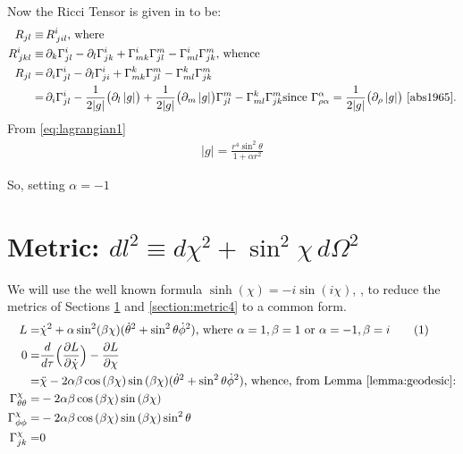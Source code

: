\documentclass[]{article}
\newcommand\numberthis{\addtocounter{equation}{1}\tag{\theequation}}
\begin{document}
Now the Ricci Tensor is given in \cite[II, (58) and (56)]{Akhmedov2017} to be:
\begin{align*}
R_{jl}\equiv&\, R^i_{\,jil}\text{, where}\\
R^i_{\,jkl}\equiv&\,\partial_k\Gamma^i_{jl}-\partial_l\Gamma^i_{jk}+\Gamma^i_{mk} \Gamma^m_{jl} - \Gamma^i_{ml} \Gamma^m_{jk}\text{, whence}\\
R_{jl}=&\,\partial_i\Gamma^i_{jl}-\partial_l\Gamma^i_{ji}+\Gamma^k_{mk} \Gamma^m_{jl} - \Gamma^k_{ml} \Gamma^m_{jk}\\
=&\,\partial_i\Gamma^i_{jl}-\frac{1}{2|g|}\big(\partial_l \, |g|\big)+\frac{1}{2|g|}\big(\partial_m \, |g|\big) \Gamma^m_{jl} - \Gamma^k_{ml} \Gamma^m_{jk}\text{since $\Gamma^{\alpha}_{\rho\alpha}=\frac{1}{2|g|}\big(\partial_\rho \, |g|\big)$ \cite{abs1965}.}
\end{align*}
From \eqref{eq:lagrangian1}
\begin{align*}
|g|=\frac{r^4\sin^2 \theta}{1+\alpha r^2}
\end{align*}




So, setting $\alpha=-1$
\section{Metric: $dl^2\equiv d\chi^2+\sin^2 \chi\,d\Omega^2$} \label{section:metric2}
We will use the well known formula $\sinh(\chi)=-i \sin(i\chi)$, \cite{wiki:sinh}, to reduce the metrics of Sections \ref{section:metric2} and \ref{section:metric4} to a common form.
\begin{align*}
L=&\dot{\chi}^2 + \alpha \sin^2(\beta \chi)(\dot\theta^2 + \sin^2 \theta \dot \phi^2)\text{, where $\alpha=1,\beta=1$ or $\alpha=-1,\beta=i$} \numberthis \label{eq:lagrangian2}\\
0=&\frac{d}{d \tau}\Big(\frac{\partial L}{\partial \dot{\chi}}\Big)-\frac{\partial L}{\partial \chi}\\
=&\ddot{\chi}-2\alpha\beta \cos{(\beta\chi)}\sin{(\beta\chi)}(\dot\theta^2 + \sin^2 \theta \dot \phi^2)\text{, whence, from Lemma \ref{lemma:geodesic}:}\\
\Gamma^{\chi}_{\theta\theta}=&-2\alpha\beta \cos{(\beta\chi)}\sin{(\beta\chi)}\\
\Gamma^{\chi}_{\phi\phi}=&-2\alpha\beta \cos{(\beta\chi)}\sin{(\beta\chi)}\sin^2 \theta\\
\Gamma^{\chi}_{jk}=&0
\end{align*}
\end{document}
